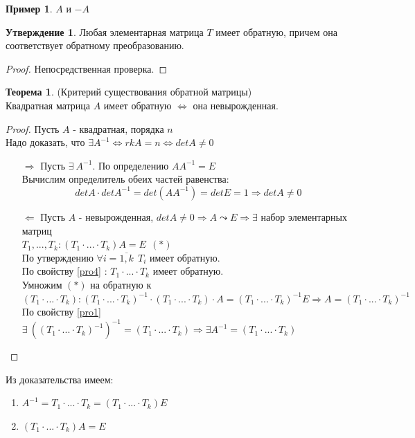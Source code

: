 \documentclass[a4paper, 12pt]{article}
\theoremstyle{definition}
\newtheorem*{theorem}{Теорема}
\newtheorem*{subtheorem}{Утверждение}
\newtheorem*{example1}{Пример}
\begin{document}
  \begin{example1}
    $A$ и $-A$ 
  \end{example1}
  \begin{subtheorem}
    Любая элементарная матрица $T$ имеет обратную, причем она соответствует обратному преобразованию. 
  \end{subtheorem} 
  \begin{proof}
    Непосредственная проверка.
  \end{proof}
  \begin{theorem}
    (Критерий существования обратной матрицы) \\
    Квадратная матрица $A$ имеет обратную $\Longleftrightarrow $ она невырожденная.
  \end{theorem} 
  \begin{proof}
    Пусть $A$ - квадратная, порядка $n$ \\
    Надо доказать, что $\exists A^{-1} \Longleftrightarrow rkA = n \Longleftrightarrow detA \not = 0$ 
    \begin{itemize}
      \item[\underline{$\Longrightarrow$}] Пусть $\exists \ A^{-1}$. По определению $AA^{-1} = E$ \\
      Вычислим определитель обеих частей равенства:
      $$detA\cdot detA^{-1} = det(AA^{-1}) = detE = 1 \Longrightarrow detA \not = 0$$ 
      \item[\underline{$\Longleftarrow$}] Пусть $A$ - невырожденная, $detA \not = 0 \Longrightarrow A \leadsto E \Longrightarrow \exists $ набор элементарных матриц \\
      $T_1,...,T_k: (T_1 \cdot ... \cdot T_k)A = E \ \ (*)$ \\
      По утверждению $\forall i = \overline{1,k} \ \ T_i$ имеет обратную.\\
      По свойству \eqref{pro4} : $T_1 \cdot ... \cdot T_k$ имеет обратную. \\
      Умножим $(*)$ на обратную к $(T_1 \cdot ... \cdot T_k): (T_1 \cdot ... \cdot T_k)^{-1} \cdot (T_1 \cdot ... \cdot T_k) \cdot A = (T_1 \cdot ... \cdot T_k)^{-1}E \Longrightarrow A = (T_1 \cdot ... \cdot T_k)^{-1}$ \\
      По свойству \eqref{pro1} $\exists \ ((T_1 \cdot ... \cdot T_k)^{-1})^{-1} = (T_1 \cdot ... \cdot T_k) \Rightarrow \exists A^{-1} = (T_1 \cdot ... \cdot T_k)$
    \end{itemize}
  \end{proof} 
  Из доказательства имеем:  
  \begin{enumerate}
    \item $A^{-1} = T_1 \cdot ... \cdot T_k = (T_1 \cdot ... \cdot T_k)E$
    \item $(T_1 \cdot ... \cdot T_k)A =E$ 
  \end{enumerate}
\end{document}
